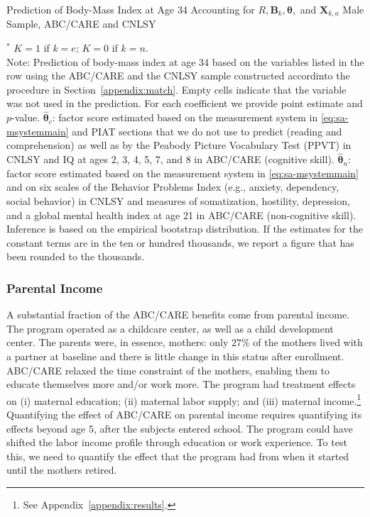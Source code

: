 \begin{table}
\begin{threeparttable}
\caption{Prediction of Body-Mass Index at Age 34 Accounting for $R, \bm{B}_k, \bm{\theta},$ and $\bm{X}_{k,a}$ Male Sample, ABC/CARE and CNLSY}
\label{table:invfin}
\centering
\scriptsize

\begin{tablenotes}
\footnotesize
\item $^\ast$ $K=1$ if $k=e$; $K=0$ if $k=n$.\\
Note: Prediction of body-mass index at age 34 based on the variables listed in the row using the ABC/CARE and the CNLSY sample constructed accordinto the procedure in Section~\ref{appendix:match}. Empty cells indicate that the variable was not used in the prediction. For each coefficient we provide point estimate and $p$-value. $\hat{\bm{\theta}}_{c}$: factor score estimated based on the measurement system in \eqref{eq:sa-msystemmain} and PIAT sections that we do not use to predict (reading and comprehension) as well as by the Peabody Picture Vocabulary Test (PPVT) in CNLSY and IQ at ages 2, 3, 4, 5, 7, and 8 in ABC/CARE (cognitive skill). $\hat{\bm{\theta}}_{n}$: factor score estimated based on the measurement system in \eqref{eq:sa-msystemmain} and on six scales of the Behavior Problems Index (e.g., anxiety, dependency, social behavior) in CNLSY and measures of somatization, hostility, depression, and a global mental health index at age 21 in ABC/CARE (non-cognitive skill). Inference is based on the empirical bootstrap distribution. If the estimates for the constant terms are in the ten or hundred thousands, we report a figure that has been rounded to the thousands.
\end{tablenotes}
\end{threeparttable}
\end{table}

\subsubsection{Parental Income}\label{app:parentalincome}

\noindent A substantial fraction of the ABC/CARE benefits come from parental income. The program operated as a childcare center, as well as a child development center. The parents were, in essence,  mothers: only $27\%$ of the mothers lived with a partner at baseline and there is little change in this status after enrollment. ABC/CARE relaxed the time constraint of the mothers, enabling them to educate themselves more and/or work more. The program had treatment effects on (i) maternal education; (ii) maternal labor supply; and (iii) maternal income.\footnote{See Appendix~\ref{appendix:results}.} Quantifying the effect of ABC/CARE on parental income requires quantifying its effects beyond age 5, after the subjects entered school. The program could have shifted the labor income profile through education or work experience. To test this, we need to quantify the effect that the program had from when it started until the mothers retired.\\

